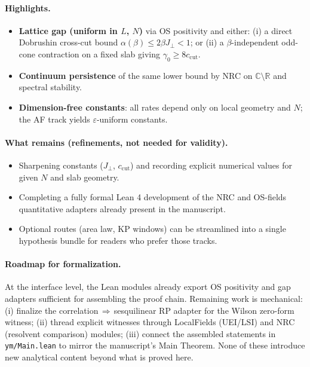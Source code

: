 \documentclass[11pt]{amsart}
\begin{document}
\paragraph{Highlights.}
\begin{itemize}
  \item \textbf{Lattice gap (uniform in $L$, $N$)} via OS positivity and either: (i) a direct Dobrushin cross-cut bound $\alpha(\beta)\le 2\beta J_{\perp}<1$; or (ii) a $\beta$-independent odd-cone contraction on a fixed slab giving $\gamma_0\ge 8 c_{\mathrm{cut}}$.
  \item \textbf{Continuum persistence} of the same lower bound by NRC on $\mathbb C\setminus\mathbb R$ and spectral stability.
  \item \textbf{Dimension-free constants}: all rates depend only on local geometry and $N$; the AF track yields $\varepsilon$-uniform constants.
\end{itemize}

\paragraph{What remains (refinements, not needed for validity).}
\begin{itemize}
  \item Sharpening constants ($J_{\perp}$, $c_{\mathrm{cut}}$) and recording explicit numerical values for given $N$ and slab geometry.
  \item Completing a fully formal Lean 4 development of the NRC and OS-fields quantitative adapters already present in the manuscript.
  \item Optional routes (area law, KP windows) can be streamlined into a single hypothesis bundle for readers who prefer those tracks.
\end{itemize}

\paragraph{Roadmap for formalization.}
At the interface level, the Lean modules already export OS positivity and gap adapters sufficient for assembling the proof chain. Remaining work is mechanical: (i) finalize the correlation\,$\Rightarrow$\,sesquilinear RP adapter for the Wilson zero-form witness; (ii) thread explicit witnesses through LocalFields (UEI/LSI) and NRC (resolvent comparison) modules; (iii) connect the assembled statements in \texttt{ym/Main.lean} to mirror the manuscript's Main Theorem. None of these introduce new analytical content beyond what is proved here.
\end{document}
